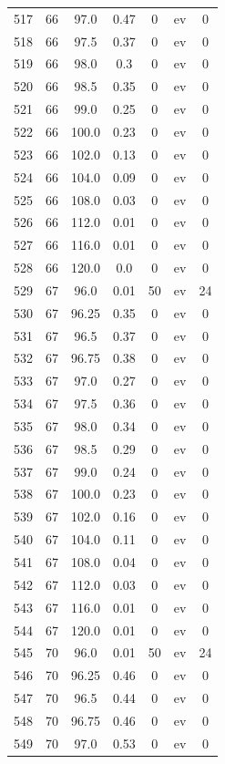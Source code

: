 \documentclass[12pt,a4paper]{article}
\begin{document}
\begin{tabular}{r|cccccc}
	517 & 66 & 97.0 & 0.47 & 0 & ev & 0 \\
	518 & 66 & 97.5 & 0.37 & 0 & ev & 0 \\
	519 & 66 & 98.0 & 0.3 & 0 & ev & 0 \\
	520 & 66 & 98.5 & 0.35 & 0 & ev & 0 \\
	521 & 66 & 99.0 & 0.25 & 0 & ev & 0 \\
	522 & 66 & 100.0 & 0.23 & 0 & ev & 0 \\
	523 & 66 & 102.0 & 0.13 & 0 & ev & 0 \\
	524 & 66 & 104.0 & 0.09 & 0 & ev & 0 \\
	525 & 66 & 108.0 & 0.03 & 0 & ev & 0 \\
	526 & 66 & 112.0 & 0.01 & 0 & ev & 0 \\
	527 & 66 & 116.0 & 0.01 & 0 & ev & 0 \\
	528 & 66 & 120.0 & 0.0 & 0 & ev & 0 \\
	529 & 67 & 96.0 & 0.01 & 50 & ev & 24 \\
	530 & 67 & 96.25 & 0.35 & 0 & ev & 0 \\
	531 & 67 & 96.5 & 0.37 & 0 & ev & 0 \\
	532 & 67 & 96.75 & 0.38 & 0 & ev & 0 \\
	533 & 67 & 97.0 & 0.27 & 0 & ev & 0 \\
	534 & 67 & 97.5 & 0.36 & 0 & ev & 0 \\
	535 & 67 & 98.0 & 0.34 & 0 & ev & 0 \\
	536 & 67 & 98.5 & 0.29 & 0 & ev & 0 \\
	537 & 67 & 99.0 & 0.24 & 0 & ev & 0 \\
	538 & 67 & 100.0 & 0.23 & 0 & ev & 0 \\
	539 & 67 & 102.0 & 0.16 & 0 & ev & 0 \\
	540 & 67 & 104.0 & 0.11 & 0 & ev & 0 \\
	541 & 67 & 108.0 & 0.04 & 0 & ev & 0 \\
	542 & 67 & 112.0 & 0.03 & 0 & ev & 0 \\
	543 & 67 & 116.0 & 0.01 & 0 & ev & 0 \\
	544 & 67 & 120.0 & 0.01 & 0 & ev & 0 \\
	545 & 70 & 96.0 & 0.01 & 50 & ev & 24 \\
	546 & 70 & 96.25 & 0.46 & 0 & ev & 0 \\
	547 & 70 & 96.5 & 0.44 & 0 & ev & 0 \\
	548 & 70 & 96.75 & 0.46 & 0 & ev & 0 \\
	549 & 70 & 97.0 & 0.53 & 0 & ev & 0 \\

\end{tabular}
\end{document}
